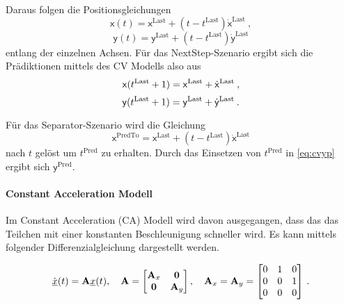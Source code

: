 Daraus folgen die Positionsgleichungen 
\begin{equation*}
    \mathsf{x}(t) = \mathsf{x}^{\text{Last}} + (t - t^{\text{Last}})\dot{\mathsf{x}}^{\text{Last}} \: ,
\end{equation*}
\begin{equation*}
    \mathsf{y}(t) = \mathsf{y}^{\text{Last}} + (t - t^{\text{Last}})\dot{\mathsf{y}}^{\text{Last}}
\end{equation*}
% 
entlang der einzelnen Achsen.
Für das NextStep-Szenario ergibt sich die Prädiktionen mittels des CV Modells also aus
\begin{equation*}
    \mathsf{x}(t{^{\text{Last}}}+1) = \mathsf{x}^{\text{Last}} + \dot{\mathsf{x}}^{\text{Last}} \: ,
\end{equation*}
\begin{equation}\label{eq:cvyp}
    \mathsf{y}(t{^{\text{Last}}}+1) = \mathsf{y}^{\text{Last}} + \dot{\mathsf{y}}^{\text{Last}} \: .
\end{equation}

Für das Separator-Szenario wird die Gleichung 
% 
\begin{equation*}
    \mathsf{x}^{\text{PredTo}} = \mathsf{x}^{\text{Last}} + (t - t^{\text{Last}})\dot{\mathsf{x}}^{\text{Last}}
\end{equation*}
% 
nach \(t\) gelöst um  \(t^{\text{Pred}}\) zu erhalten.
Durch das Einsetzen von \(t^{\text{Pred}}\) in \eqref{eq:cvyp} ergibt sich \(\mathsf{y}^{\text{Pred}}\).

\paragraph{Constant Acceleration Modell}

Im Constant Acceleration (CA) Modell wird davon ausgegangen, dass das das Teilchen mit einer konstanten Beschleunigung schneller wird.
Es kann mittels folgender Differenzialgleichung dargestellt werden.

\begin{align*} \label{eq:speedCV}
    \dot{{\underline{x}}}(t) = {{\mathbf{A}}}{\underline{x}}(t), \quad {\ensuremath{{\mathbf{A}}}} = 
    \begin{bmatrix}
        {\ensuremath{{\mathbf{A}}}}_x & \boldsymbol{0} \\
        \boldsymbol{0} & {{\mathbf{A}}}_y
    \end{bmatrix} 
    , \quad
    {\ensuremath{{\mathbf{A}}}}_x = {{\mathbf{A}}}_y = 
    \begin{bmatrix}
        0 & 1 & 0 \\
        0 & 0 & 1 \\
        0 & 0 & 0
    \end{bmatrix} \, .
\end{align*}

